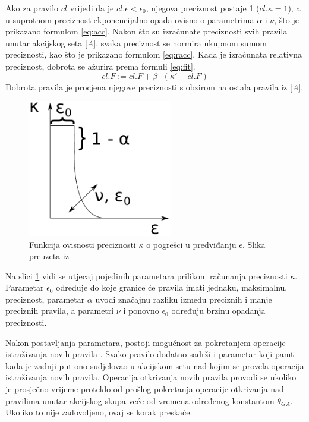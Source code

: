 \documentclass[times, utf8, zavrsni]{fer}
\begin{document}
Ako za pravilo $cl$ vrijedi da je $cl.\epsilon < \epsilon_{0}$, njegova preciznost postaje 1 ($cl.\kappa = 1$), a u suprotnom preciznost ekponencijalno opada ovisno o parametrima $\alpha$ i $\nu$, što je prikazano formulom \eqref{eq:acc}.
Nakon što su izračunate preciznosti svih pravila unutar akcijskog seta [\emph{A}], svaka preciznost se normira ukupnom sumom preciznosti, kao što je prikazano formulom \eqref{eq:racc}.
Kada je izračunata relativna preciznost, dobrota se ažurira prema formuli \eqref{eq:fit}.
\begin{equation}
    \label{eq:fit}
    cl.F := cl.F + \beta \cdot (\kappa' - cl.F)
\end{equation}
Dobrota pravila je procjena njegove preciznosti s obzirom na ostala pravila iz [\emph{A}].
\begin{figure}[h]
    \centering
    \includegraphics[height=6cm]{img/fit.pdf}
    \caption{Funkcija ovisnosti preciznosti $\kappa$ o pogrešci u predviđanju $\epsilon$. Slika preuzeta iz \citep{5}}
    \label{img:fit}
\end{figure}
Na slici \ref{img:fit} vidi se utjecaj pojedinih parametara prilikom računanja preciznosti $\kappa$.
Parametar $\epsilon_{0}$ određuje do koje granice će pravila imati jednaku, maksimalnu, preciznost, parametar $\alpha$ uvodi značajnu razliku između preciznih i manje preciznih pravila, a parametri $\nu$ i ponovno $\epsilon_{0}$ određuju brzinu opadanja preciznosti.

Nakon postavljanja parametara, postoji mogućnost za pokretanjem operacije istraživanja novih pravila .
Svako pravilo dodatno sadrži i parametar koji pamti kada je zadnji put ono sudjelovao u akcijskom setu nad kojim se provela operacija istraživanja novih pravila.
Operacija otkrivanja novih pravila provodi se ukoliko je prosječno vrijeme proteklo od prošlog pokretanja operacije otkrivanja nad pravilima unutar akcijskog skupa veće od vremena određenog konstantom $\theta_{GA}$.
Ukoliko to nije zadovoljeno, ovaj se korak preskače.
\end{document}
